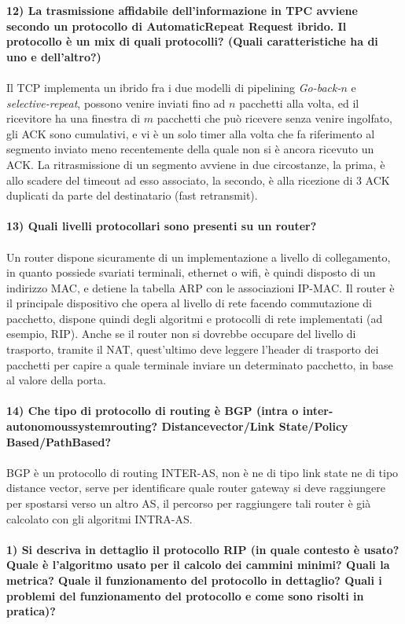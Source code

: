 \documentclass[12pt, letterpaper]{article}
\newcommand{\acc}{\\\hphantom{}\\}
\begin{document}
\textbf{12) La trasmissione affidabile dell'informazione in TPC avviene secondo un protocollo di AutomaticRepeat Request ibrido.
 Il protocollo è un mix di quali protocolli? (Quali caratteristiche ha di uno e dell'altro?)}\acc 
 Il TCP implementa un ibrido fra i due modelli di pipelining \textit{Go-back-$n$} e \textit{selective-repeat}, possono venire 
 inviati fino ad $n$ pacchetti alla volta, ed il ricevitore ha una finestra di $m$ pacchetti che può ricevere senza venire ingolfato, 
 gli ACK sono cumulativi, e vi è un solo timer alla volta che fa riferimento al segmento inviato meno recentemente della quale 
 non si è ancora ricevuto un ACK. La ritrasmissione di un segmento avviene in due circostanze, la prima, è allo scadere del 
 timeout ad esso associato, la secondo, è alla ricezione di 3 ACK duplicati da parte del destinatario (fast retransmit).\acc 


 \textbf{13) Quali livelli protocollari sono presenti su un router?}\acc 
 Un router dispone sicuramente di un implementazione a livello di collegamento, in quanto possiede svariati 
 terminali, ethernet o wifi, è quindi disposto di un indirizzo MAC, e detiene la tabella ARP con le associazioni 
 IP-MAC. Il router è il principale dispositivo che opera al livello di rete facendo commutazione di pacchetto, dispone 
 quindi degli algoritmi e protocolli di rete implementati (ad esempio, RIP). Anche se il router non si dovrebbe occupare 
 del livello di trasporto, tramite il NAT, quest'ultimo deve leggere l'header di trasporto dei pacchetti per 
 capire a quale terminale inviare un determinato pacchetto, in base al valore della porta.\acc



 \textbf{14) Che tipo di protocollo di routing è BGP (intra o 
 inter-autonomoussystemrouting? Distancevector/Link State/Policy Based/PathBased?}\acc
 BGP è un protocollo di routing INTER-AS, non è ne di tipo link state ne di tipo distance vector, serve per identificare 
 quale router gateway si deve raggiungere per spostarsi verso un altro AS, il percorso per raggiungere tali router 
 è già calcolato con gli algoritmi INTRA-AS.\acc



    

 \textbf{1) Si descriva in dettaglio il protocollo RIP (in quale contesto è usato? Quale 
 è l'algoritmo usato per il calcolo dei cammini minimi? Quali la metrica? Quale il funzionamento 
 del protocollo in dettaglio? Quali i problemi del funzionamento del protocollo e come sono risolti in pratica)?}\acc
\end{document}
